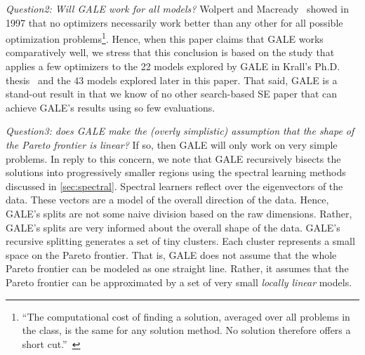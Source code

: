 \documentclass[10pt,journal,compsoc]{IEEEtran}
\newcommand{\tion}[1]{\textsection\ref{sec:#1}}
\newenvironment{changed}{\par\color{MyDarkBlue}}{\par}
\begin{document}
\begin{changed}
{\em Question2: Will GALE work for all models?}
Wolpert and Macready~\cite{wolpert97} showed in 1997
that no optimizers necessarily work better than any
other for all possible optimization
problems\footnote{``The computational
  cost of finding a solution, averaged over all
  problems in the class, is the same for any
  solution method.  No solution therefore offers a
  short cut.''~\cite{wolpert97}}. Hence, when this paper claims that
GALE works comparatively well, we  stress that this conclusion 
is based on the study that applies a few optimizers to the
22 models explored by GALE in Krall's Ph.D. thesis~\cite{krall14f}
and the 43 models explored later in this paper.
That said, GALE is a stand-out result in that we know of no other search-based
SE paper that can achieve GALE's results using so few evaluations.


{\em Question3: does GALE make the (overly simplistic) assumption
that the shape of the Pareto frontier is linear?}  If so, then GALE will
only work on very simple problems.
In reply to this concern, we note that GALE
recursively bisects the solutions into progressively
smaller regions using the spectral learning methods 
discussed in \tion{spectral}. Spectral learners
reflect over the eigenvectors of the data.
These vectors are a model of the overall direction of the
data.  Hence, GALE's splits are not some naive division based
on the raw dimensions. Rather, GALE's splits are very informed about the overall
shape of the data.
GALE's recursive splitting generates a set of
tiny clusters. Each cluster   represents a small space
on the Pareto frontier.  That is, GALE does not
assume that the whole Pareto frontier can be modeled
as one straight line. Rather, it assumes that the
Pareto frontier can be approximated by a set of very
small {\em locally linear} models.

\end{changed}

\newcommand{\Yes}{\ding{51}}
\newcommand{\No}{\ding{55}}
\end{document}
